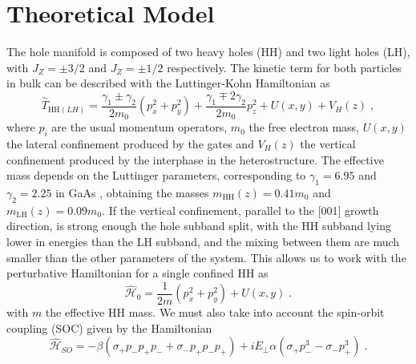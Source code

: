 
\chapter{Theoretical Model} %

\label{sec:Model} %


The hole manifold is composed of two heavy holes (HH) and two light holes (LH), with $J_Z=\pm3/2$ and $J_Z=\pm1/2$ respectively. The kinetic term for both particles in bulk can be described with the Luttinger-Kohn Hamiltonian \cite{Bulaev2005,Luttinger1956} as
\begin{equation}
	\hat{T}_{\text{HH}(LH)}=\frac{\gamma_1\pm \gamma_2}{2m_0}(p_x^2+p_y^2)+\frac{\gamma_1\mp 2\gamma_2}{2m_0}p_z^2+U(x,y)+V_H(z)\; ,
\end{equation}
where $p_i$ are the usual momentum operators, $m_0$ the free electron mass, $U(x,y)$ the lateral confinement produced by the gates and $V_H(z)$ the vertical confinement produced by the interphase in the heterostructure. The effective mass depends on the Luttinger parameters, corresponding to $\gamma_1=6.95$  and $\gamma_2=2.25$ in GaAs \cite{Bogan2018}, obtaining the masses $m_{\text{HH}}(z)=0.41m_0$ and $m_{\text{LH}}(z)=0.09m_0$. If the vertical confinement, parallel to the [001] growth direction, is strong enough the hole subband split, with the HH subband lying lower in energies than the LH subband, and the mixing between them are much smaller than the other parameters of the system. This allows us to work with the perturbative Hamiltonian for a single confined HH as
\begin{equation}
	\hat{\mathcal{H}}_0=\frac{1}{2m}(p_x^2+p_y^2)+U(x,y)\; .
\end{equation}
with $m$ the effective HH mass. We must also take into account the spin-orbit coupling (SOC) given by the Hamiltonian
\begin{equation}
	\hat{\mathcal{H}}_{SO}=-\beta (\sigma_+p_-p_+p_-+\sigma_-p_+p_-p_+) + iE_\perp\alpha(\sigma_+p_-^3-\sigma_-p_+^3)\; .
	\label{eq:SOC_Hamiltonain}
\end{equation}
